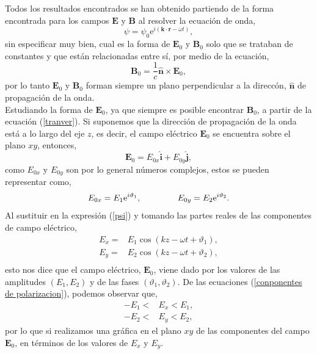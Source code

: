 \documentclass[11pt,fleqn]{book} %
\begin{document}
Todos los resultados encontrados se han obtenido partiendo de la forma encontrada para los campos $\textbf{E}$ y $\textbf{B}$ al resolver la
ecuaci\'on de onda,
\begin{equation*}
 \psi=\psi_0 \text{e}^{i(\textbf{k}\cdot \textbf{r}-\omega t)},
\end{equation*}
sin especificar muy bien, cual es la forma de $\textbf{E}_0$ y $\textbf{B}_0$ solo que se trataban de constantes y que est\'an relacionadas
entre s\'i, por medio de la ecuaci\'on,
\begin{equation*}
\textbf{B}_0=\frac{1}{c}\hat{\textbf{n}}\times\textbf{E}_0,
\end{equation*}
por lo tanto $\textbf{E}_0$ y $\textbf{B}_0$ forman siempre un plano perpendicular a la direcc\'on, $\hat{\textbf{n}}$ de propagaci\'on de la onda.\\
Estudiando la forma de $\textbf{E}_0$, ya que siempre es posible encontrar $\textbf{B}_0$, a partir de la ecuaci\'on (\ref{tranver}).
Si suponemos que la direcci\'on de propagaci\'on de la onda est\'a a lo largo del eje $z$, es decir, el campo el\'ectrico $\textbf{E}_0$
se encuentra sobre el plano $xy$, entonces,
\begin{equation*}
\textbf{E}_0=E_{0x}\hat{\textbf{i}}+E_{0y}\hat{\textbf{j}},
\end{equation*}
como $E_{0x}$ y $E_{0y}$ son por lo general n\'umeros complejos, estos se pueden representar como,
\begin{equation*}
E_{0x}=E_1\text{e}^{i\vartheta_1}, \hspace{1.5cm}  E_{0y}=E_2\text{e}^{i\vartheta_2}.
\end{equation*}
Al sustituir en la expresi\'on (\ref{psi}) y tomando las partes reales de las componentes de campo el\'ectrico,
\begin{equation} \label{conponentes de polarizacion}
 \begin{split}
  E_x=&E_1 \cos(kz-\omega t +\vartheta_1),\\
 E_y=&E_2 \cos(kz-\omega t +\vartheta_2),\\
 \end{split}
\end{equation}
esto nos dice que el campo el\'ectrico, $\textbf{E}_0$, viene dado por los valores de las amplitudes $(E_1,E_2)$ y de las fases $(\vartheta_1,\vartheta_2)$.
De las ecuaciones (\ref{conponentes de polarizacion}), podemos observar que,
\begin{equation*}
 \begin{split}
-E_1<&E_x<E_1,\\
-E_2<&E_y<E_2,
\end{split}
\end{equation*}
por lo que si realizamos una gr\'afica en el plano $xy$ de las componentes del campo $\textbf{E}_0$, en t\'erminos de los valores de $E_x$ y
$E_y$. \\
\end{document}

